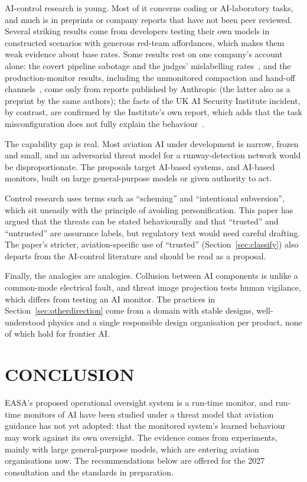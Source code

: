 \documentclass{aer}
\begin{document}
AI-control research is young. Most of it concerns coding or AI-laboratory tasks, and much is in preprints or company reports that have not been peer reviewed. Several striking results come from developers testing their own models in constructed scenarios with generous red-team affordances, which makes them weak evidence about base rates. Some results rest on one company's account alone: the covert pipeline sabotage and the judges' mislabelling rates~\citep{lynch2026agentic}, and the production-monitor results, including the unmonitored compaction and hand-off channels~\citep{remedios2026redteaming}, come only from reports published by Anthropic (the latter also as a preprint by the same authors); the facts of the UK AI Security Institute incident, by contrast, are confirmed by the Institute's own report, which adds that the task misconfiguration does not fully explain the behaviour~\citep{aisi2026incident}.

The capability gap is real. Most aviation AI under development is narrow, frozen and small, and an adversarial threat model for a runway-detection network would be disproportionate. The proposals target AI-based systems, and AI-based monitors, built on large general-purpose models or given authority to act.

Control research uses terms such as ``scheming'' and ``intentional subversion'', which sit uneasily with the principle of avoiding personification. This paper has argued that the threats can be stated behaviourally and that ``trusted'' and ``untrusted'' are assurance labels, but regulatory text would need careful drafting. The paper's stricter, aviation-specific use of ``trusted'' (Section~\ref{sec:classify}) also departs from the AI-control literature and should be read as a proposal.

Finally, the analogies are analogies. Collusion between AI components is unlike a common-mode electrical fault, and threat image projection tests human vigilance, which differs from testing an AI monitor. The practices in Section~\ref{sec:otherdirection} come from a domain with stable designs, well-understood physics and a single responsible design organisation per product, none of which hold for frontier AI.

\section{CONCLUSION}\label{sec:conclusion}

EASA's proposed operational oversight system is a run-time monitor, and run-time monitors of AI have been studied under a threat model that aviation guidance has not yet adopted: that the monitored system's learned behaviour may work against its own oversight. The evidence comes from experiments, mainly with large general-purpose models, which are entering aviation organisations now. The recommendations below are offered for the 2027 consultation and the standards in preparation.
\end{document}
